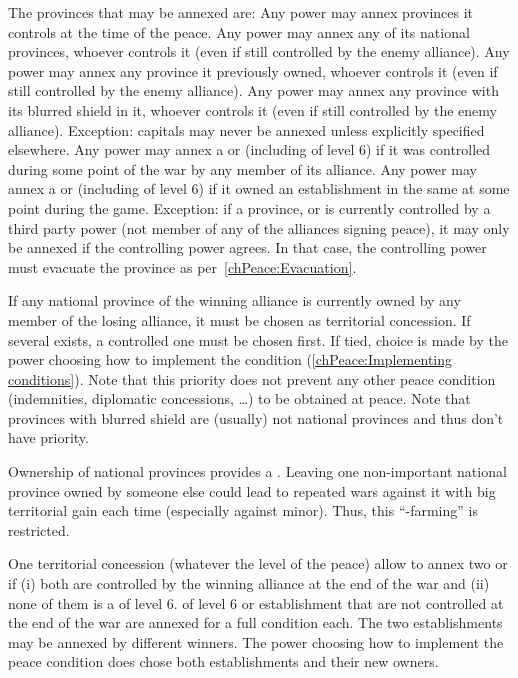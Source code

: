  The provinces that may be annexed are:
\bparag Any power may annex provinces it controls at the time of the peace.
\bparag Any power may annex any of its national provinces, whoever controls it
(even if still controlled by the enemy alliance).
\bparag Any power may annex any province it previously owned, whoever controls
it (even if still controlled by the enemy alliance).
\bparag Any power may annex any province with its blurred shield in it,
whoever controls it (even if still controlled by the enemy alliance).
\bparag Exception: capitals may never be annexed unless explicitly specified
elsewhere.
\bparag Any power may annex a \TP or \COL (including of level 6) if it was
controlled during some point of the war by any member of its alliance.
\bparag Any power may annex a \TP or \COL (including of level 6) if it owned
an establishment in the same \Area at some point during the game.
\bparag Exception: if a province, \TP or \COL is currently controlled by a
third party power (not member of any of the alliances signing peace), it may
only be annexed if the controlling power agrees. In that case, the controlling
power must evacuate the province as per~\ref{chPeace:Evacuation}.

\aparag[Priority] If any national province of the winning alliance is
currently owned by any member of the losing alliance, it must be chosen as
territorial concession.
\bparag If several exists, a controlled one must be chosen first.
\bparag If tied, choice is made by the power choosing how to implement the
condition (\ref{chPeace:Implementing conditions}).
\bparag Note that this priority does not prevent any other peace condition
(indemnities, diplomatic concessions, \ldots) to be obtained at peace.
\bparag Note that provinces with blurred shield are (usually) not national
provinces and thus don't have priority.

\begin{designnote}
  Ownership of national provinces provides a \CB. Leaving one non-important
  national province owned by someone else could lead to repeated wars against
  it with big territorial gain each time (especially against minor). Thus,
  this ``\CB-farming'' is restricted.
\end{designnote}

\bparag One territorial concession (whatever the level of the peace) allow to
annex two \COL or \TP if (i) both are controlled by the winning alliance at
the end of the war and (ii) none of them is a \COL of level 6.
\bparag \COL of level 6 or establishment that are not controlled at the end of
the war are annexed for a full condition each.
\bparag The two establishments may be annexed by different winners.
\bparag The power choosing how to implement the peace condition does chose
both establishments and their new owners.

